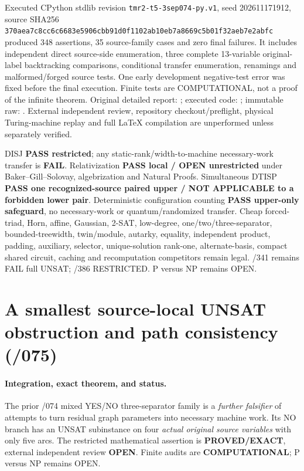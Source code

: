 \documentclass[11pt]{article}
\begin{document}
Executed CPython stdlib revision
\texttt{tmr2-t5-3sep074-py.v1}, seed 202611171912,
source SHA256
\texttt{370aea7c8cc6c6683e5906cbb91d0f1102ab10eb7a8669c5b01f32aeb7e2abfc}
produced 348 assertions, 35 source-family cases and zero
final failures. It includes independent direct source-side
enumeration, three complete 13-variable original-label
backtracking comparisons, conditional transfer enumeration,
renamings and malformed/forged source tests. One early
development negative-test error was fixed before the final
execution. Finite tests are COMPUTATIONAL, not a proof of
the infinite theorem. Original detailed report:
;
executed code:
;
immutable raw:
.
External independent review, repository checkout/preflight,
physical Turing-machine replay and full LaTeX compilation
are unperformed unless separately verified.

DISJ \textbf{PASS restricted}; any static-rank/width-to-machine
necessary-work transfer is \textbf{FAIL}. Relativization
\textbf{PASS local / OPEN unrestricted} under
Baker--Gill--Solovay, algebrization and Natural Proofs.
Simultaneous DTISP \textbf{PASS one recognized-source paired
upper / NOT APPLICABLE to a forbidden lower pair}.
Deterministic configuration counting \textbf{PASS upper-only
safeguard}, no necessary-work or quantum/randomized transfer.
Cheap forced-triad, Horn, affine, Gaussian, 2-SAT, low-degree,
one/two/three-separator, bounded-treewidth, twin/module,
autarky, equality, independent product, padding, auxiliary,
selector, unique-solution rank-one, alternate-basis,
compact shared circuit, caching and recomputation competitors
remain legal. /341 remains FAIL full UNSAT; /386 RESTRICTED.
P versus NP remains OPEN.

\section{A smallest source-local UNSAT obstruction and path consistency (/075)}
\paragraph{Integration, exact theorem, and status.}
The prior /074 mixed YES/NO three-separator family is a
\emph{further falsifier} of attempts to turn residual graph
parameters into necessary machine work. Its NO branch has an
UNSAT subinstance on four \emph{actual original source variables}
with only five arcs. The restricted mathematical assertion is
\textbf{PROVED/EXACT}, external independent review \textbf{OPEN}.
Finite audits are \textbf{COMPUTATIONAL}; P versus NP remains OPEN.
\end{document}
